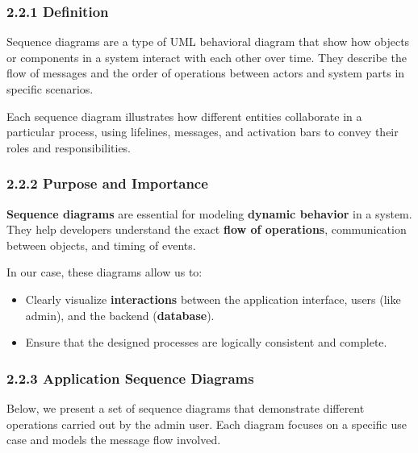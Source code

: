 \documentclass[12pt]{report}
\begin{document}
\subsubsection*{2.2.1 Definition}
\vspace{0.1cm}

Sequence diagrams are a type of UML behavioral diagram that show how objects or components in a system interact with each other over time. They describe the flow of messages and the order of operations between actors and system parts in specific scenarios.

Each sequence diagram illustrates how different entities collaborate in a particular process, using lifelines, messages, and activation bars to convey their roles and responsibilities.

\subsubsection*{2.2.2 Purpose and Importance}
\vspace{0.1cm}


\textbf{Sequence diagrams} are essential for modeling \textbf{dynamic behavior} in a system. They help developers understand the exact \textbf{flow of operations}, communication between objects, and timing of events.

In our case, these diagrams allow us to:
\begin{itemize}
	\item Clearly visualize \textbf{interactions} between the application interface, users (like admin), and the backend (\textbf{database}).
	\item Ensure that the designed processes are logically consistent and complete.
\end{itemize}


\subsubsection*{2.2.3 Application Sequence Diagrams}
\vspace{0.1cm}

Below, we present a set of sequence diagrams that demonstrate different operations carried out by the admin user. Each diagram focuses on a specific use case and models the message flow involved.
\end{document}
